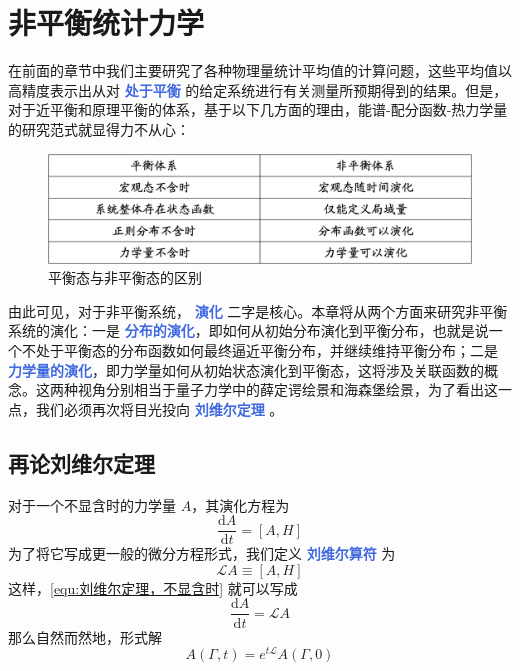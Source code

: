 \chapter{非平衡统计力学}

在前面的章节中我们主要研究了各种物理量统计平均值的计算问题，这些平均值以高精度表示出从对 \textcolor{RoyalBlue}{\textbf{\kaishu 处于平衡}} 的给定系统进行有关测量所预期得到的结果。但是，对于近平衡和原理平衡的体系，基于以下几方面的理由，能谱-配分函数-热力学量的研究范式就显得力不从心：

\begin{figure}[ht]
    \centering
    \includegraphics[width=1\textwidth]{figures/equ-nonequ.png}
    \caption{\kaishu 平衡态与非平衡态的区别}
    \label{fig:equ-nonequ}
\end{figure}

由此可见，对于非平衡系统， \textcolor{RoyalBlue}{\textbf{\kaishu 演化}} 二字是核心。本章将从两个方面来研究非平衡系统的演化：一是 \textcolor{RoyalBlue}{\textbf{\kaishu 分布的演化}}，即如何从初始分布演化到平衡分布，也就是说一个不处于平衡态的分布函数如何最终逼近平衡分布，并继续维持平衡分布；二是 \textcolor{RoyalBlue}{\textbf{\kaishu 力学量的演化}}，即力学量如何从初始状态演化到平衡态，这将涉及关联函数的概念。这两种视角分别相当于量子力学中的薛定谔绘景和海森堡绘景，为了看出这一点，我们必须再次将目光投向 \textcolor{RoyalBlue}{\textbf{\kaishu 刘维尔定理}} 。

\section{再论刘维尔定理}

对于一个不显含时的力学量 $A$，其演化方程为
\begin{equation}\label{equ:刘维尔定理，不显含时}
    \frac{\mathrm{d} A}{\mathrm{d} t} =  [A, H]
\end{equation}
为了将它写成更一般的微分方程形式，我们定义 \textcolor{RoyalBlue}{\textbf{\kaishu 刘维尔算符}} 为
\begin{equation}\label{equ:刘维尔算符}
    \mathcal{L}A \equiv [A, H]
\end{equation}
这样，\eqref{equ:刘维尔定理，不显含时} 就可以写成
\begin{equation}\label{equ:刘维尔定理，不显含时，微分方程形式}
    \frac{\mathrm{d} A}{\mathrm{d} t} =  \mathcal{L}A
\end{equation}
那么自然而然地，形式解
\begin{equation}\label{equ:形式解}
    A(\Gamma,t) = e^{t\mathcal{L}}A(\Gamma,0)
\end{equation}

